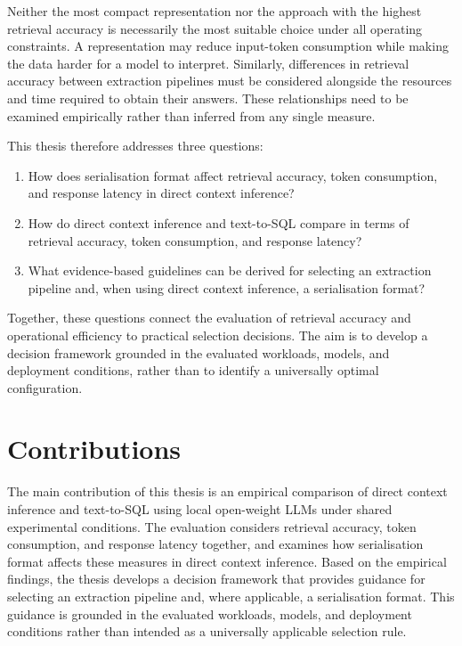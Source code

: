 Neither the most compact representation nor the approach with the highest retrieval accuracy is
necessarily the most suitable choice under all operating constraints. A representation may reduce
input-token consumption while making the data harder for a model to interpret. Similarly, differences in
retrieval accuracy between extraction pipelines must be considered alongside the resources and time
required to obtain their answers. These relationships need to be examined empirically rather than
inferred from any single measure.

This thesis therefore addresses three questions:

\begin{enumerate}
  \item How does serialisation format affect retrieval accuracy, token consumption, and response latency
    in direct context inference?
  \item How do direct context inference and text-to-SQL compare in terms of retrieval accuracy, token
    consumption, and response latency?
  \item What evidence-based guidelines can be derived for selecting an extraction pipeline and, when using
    direct context inference, a serialisation format?
\end{enumerate}

Together, these questions connect the evaluation of retrieval accuracy and operational efficiency to
practical selection decisions. The aim is to develop a decision framework grounded in the evaluated
workloads, models, and deployment conditions, rather than to identify a universally optimal configuration.

\section{Contributions}

The main contribution of this thesis is an empirical comparison of direct context inference and
text-to-SQL using local open-weight LLMs under shared experimental conditions. The evaluation considers
retrieval accuracy, token consumption, and response latency together, and examines how serialisation
format affects these measures in direct context inference. Based on the empirical findings, the thesis
develops a decision framework that provides guidance for selecting an extraction pipeline and, where
applicable, a serialisation format. This guidance is grounded in the evaluated workloads, models, and
deployment conditions rather than intended as a universally applicable selection rule.

